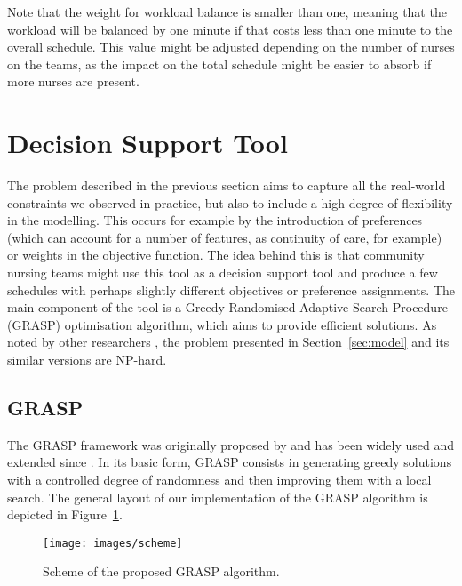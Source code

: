 \documentclass[a4paper,11pt,authoryear]{elsarticle}
\begin{document}
\noindent Note that the weight for workload balance is smaller than one, meaning that the workload will be balanced by one minute if that costs less than one minute to the overall schedule. This value might be adjusted depending on the number of nurses on the teams, as the impact on the total schedule might be easier to absorb if more nurses are present.

\section{Decision Support Tool}
\label{sec:dst}
\noindent The problem described in the previous section aims to capture all the real-world constraints we observed in practice, but also to include a high degree of flexibility in the modelling. This occurs for example by the introduction of preferences (which can account for a number of features, as continuity of care, for example) or weights in the objective function. The idea behind this is that community nursing teams might use this tool as a decision support tool and produce a few schedules with perhaps slightly different objectives or preference assignments. The main component of the tool is a Greedy Randomised Adaptive Search Procedure (GRASP) optimisation algorithm, which aims to provide efficient solutions. As noted by other researchers \cite[e.g.][]{bertels2006, rasmussen2012, mankowska2014}, the problem presented in Section~\ref{sec:model} and its similar versions are NP-hard.

\subsection{GRASP}
\label{sub:grasp}
\noindent The GRASP framework was originally proposed by \cite{feo1989} and has been widely used and extended since \citep{resende2016}. In its basic form, GRASP consists in generating greedy solutions with a controlled degree of randomness and then improving them with a local search. The general layout of our implementation of the GRASP algorithm is depicted in Figure~\ref{fig:graspdiagram}.

\begin{figure}[htb!]
    \centering
    \texttt{[image: images/scheme]}
    \caption{Scheme of the proposed GRASP algorithm.}
    \label{fig:graspdiagram}
\end{figure}
\end{document}
